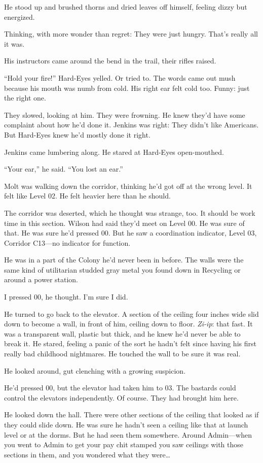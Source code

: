 He stood up and brushed thorns and dried leaves off himself, feeling dizzy but energized.

Thinking, with more wonder than regret: They were just hungry. That's really all it was.

His instructors came around the bend in the trail, their rifles raised.

``Hold your fire!'' Hard-Eyes yelled. Or tried to. The words came out mush because his mouth was numb from cold. His right ear felt cold too. Funny: just the right one.

They slowed, looking at him. They were frowning. He knew they'd have some complaint about how he'd done it. Jenkins was right: They didn't like Americans. But Hard-Eyes knew he'd mostly done it right.

Jenkins came lumbering along. He stared at Hard-Eyes open-mouthed.

``Your ear,'' he said. ``You lost an ear.''

Molt was walking down the corridor, thinking he'd got off at the wrong level. It felt like Level 02. He felt heavier here than he should.

The corridor was deserted, which he thought was strange, too. It should be work time in this section. Wilson had said they'd meet on Level 00. He was sure of that. He was sure he'd pressed 00. But he saw a coordination indicator, Level 03, Corridor C13---no indicator for function.

He was in a part of the Colony he'd never been in before. The walls were the same kind of utilitarian studded gray metal you found down in Recycling or around a power station.

I pressed 00, he thought. I'm sure I did.

He turned to go back to the elevator. A section of the ceiling four inches wide slid down to become a wall, in front of him, ceiling down to floor. \textit{Zi-ip}: that fast. It was a transparent wall, plastic but thick, and he knew he'd never be able to break it. He stared, feeling a panic of the sort he hadn't felt since having his first really bad childhood nightmares. He touched the wall to be sure it was real.

He looked around, gut clenching with a growing suspicion.

He'd pressed 00, but the elevator had taken him to 03. The bastards could control the elevators independently. Of course. They had brought him here.

He looked down the hall. There were other sections of the ceiling that looked as if they could slide down. He was sure he hadn't seen a ceiling like that at launch level or at the dorms. But he had seen them somewhere. Around Admin---when you went to Admin to get your pay chit stamped you saw ceilings with those sections in them, and you wondered what they were\ldots

